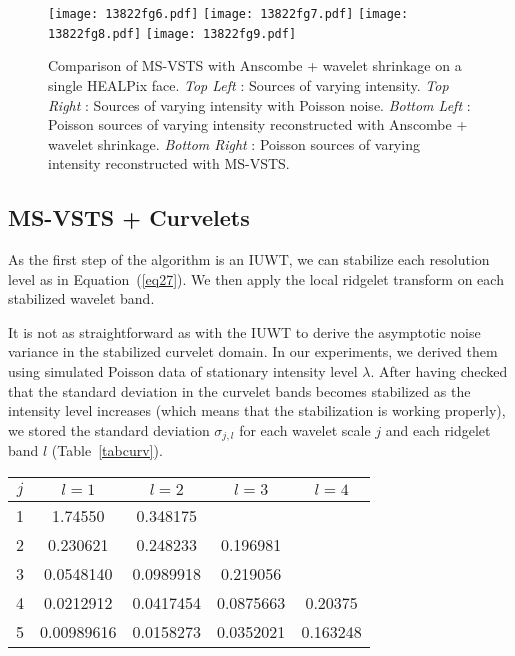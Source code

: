 \begin{figure}[htb]
\centering
\texttt{[image: 13822fg6.pdf]}
\texttt{[image: 13822fg7.pdf]}
\texttt{[image: 13822fg8.pdf]}
\texttt{[image: 13822fg9.pdf]}
\caption{Comparison of MS-VSTS with Anscombe + wavelet shrinkage on a single HEALPix face.
\emph{Top Left} : Sources of varying intensity.
\emph{Top Right} : Sources of varying intensity with Poisson noise.
\emph{Bottom Left} : Poisson sources of varying intensity reconstructed with Anscombe + wavelet shrinkage.
\emph{Bottom Right} : Poisson sources of varying intensity reconstructed with MS-VSTS.
}
\label{ansc}
\end{figure}

\subsection{MS-VSTS + Curvelets}

As the first step of the algorithm is an IUWT, we can stabilize each resolution level as in Equation~(\ref{eq27}). We then apply the local ridgelet transform on each stabilized wavelet band.

It is not as straightforward as with the IUWT to derive the asymptotic noise variance in the stabilized curvelet domain. In our experiments, we derived them using simulated Poisson data of stationary intensity level $\lambda$. After having checked that the standard deviation in the curvelet bands becomes stabilized as the intensity level increases (which means that the stabilization is working properly), we stored the standard deviation $\sigma_{j,l}$ for each wavelet scale $j$ and each ridgelet band $l$ (Table~\ref{tabcurv}).

\begin{table*}[!h]
  \centering
   \caption{Asymptotic values of the variances $\sigma_{j,k}$ of the curvelet coefficients.
  }
  \begin{tabular}{|c|c|c|c|c|}
\hline
 $j$ & $l=1$ & $l=2$ & $l=3$ & $l=4$ \\
\hline
  1 & 1.74550 & 0.348175 & & \\
  2 & 0.230621 & 0.248233 & 0.196981 & \\
  3 & 0.0548140 & 0.0989918 & 0.219056 & \\
  4 & 0.0212912 & 0.0417454 & 0.0875663 & 0.20375 \\
  5 & 0.00989616 & 0.0158273 & 0.0352021 & 0.163248 \\
\hline
\end{tabular}
 
  \label{tabcurv}
\end{table*}
